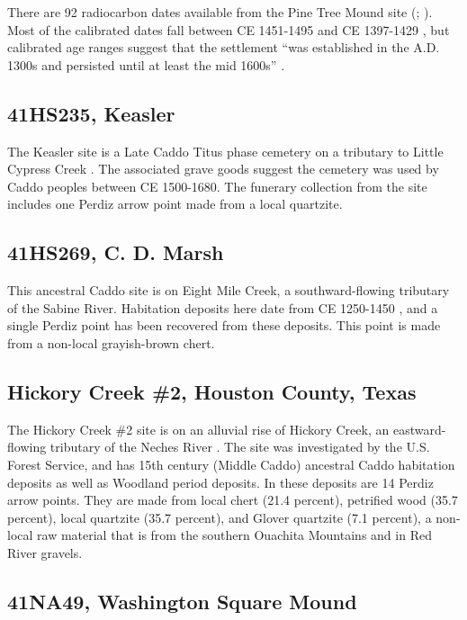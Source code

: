 \documentclass[review]{elsarticle}
\begin{document}
There are 92 radiocarbon dates available from the Pine Tree Mound site  (\citealp[Table 4.13]{RN5724}; \citealp[Table 2]{RN2944}). Most of the calibrated dates fall between CE 1451-1495 and CE 1397-1429 \citep[Table 3]{RN2944}, but calibrated age ranges suggest that the settlement “was established in the A.D. 1300s and persisted until at least the mid 1600s” \citep[299]{RN5724}.

\subsection*{41HS235, Keasler}

The Keasler site is a Late Caddo Titus phase cemetery on a tributary to Little Cypress Creek \citep{RN8983}. The associated grave goods suggest the cemetery was used by Caddo peoples between CE 1500-1680. The funerary collection from the site includes one Perdiz arrow point made from a local quartzite.

\subsection*{41HS269, C. D. Marsh}

This ancestral Caddo site is on Eight Mile Creek, a southward-flowing tributary of the Sabine River. Habitation deposits here date from CE 1250-1450 \citep{RN1536}, and a single Perdiz point has been recovered from these deposits. This point is made from a non-local grayish-brown chert.

\subsection*{Hickory Creek \#2, Houston County, Texas}

The Hickory Creek \#2 site is on an alluvial rise of Hickory Creek, an eastward-flowing tributary of the Neches River \citep{RN2347}. The site was investigated by the U.S. Forest Service, and has 15th century (Middle Caddo) ancestral Caddo habitation deposits as well as Woodland period deposits. In these deposits are 14 Perdiz arrow points. They are made from local chert (21.4 percent), petrified wood (35.7 percent), local quartzite (35.7 percent), and Glover quartzite (7.1 percent), a non-local raw material that is from the southern Ouachita Mountains and in Red River gravels.

\subsection*{41NA49, Washington Square Mound}
\end{document}
